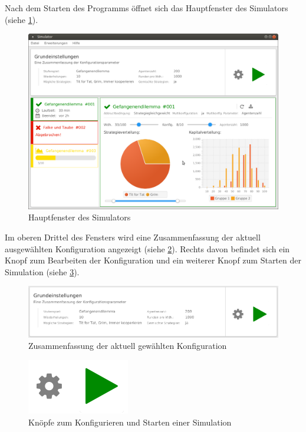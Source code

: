 \documentclass[parskip=full,11pt]{scrartcl}
\begin{document}
Nach dem Starten des Programms öffnet sich das Hauptfenster des Simulators \\(siehe \cref{fig:home}).

\begin{figure}[hb]
	\includegraphics[width=\textwidth]{images/home.png}
	\caption{\label{fig:home}
		Hauptfenster des Simulators}
\end{figure}

Im oberen Drittel des Fensters wird eine Zusammenfassung der aktuell ausgewählten Konfiguration angezeigt (siehe \cref{fig:home_top}). Rechts davon befindet sich ein Knopf zum Bearbeiten der Konfiguration und ein weiterer Knopf zum Starten der Simulation (siehe \cref{fig:main_btn}).
 
\begin{figure}[hb]
	\centering
	\includegraphics[width=\textwidth]{images/home_top.png}
	\caption{\label{fig:home_top}
	Zusammenfassung der aktuell gewählten Konfiguration}
\end{figure} 
 
\begin{figure}[ht]
	\centering
 	\includegraphics{images/main_btn.png}
 	\caption{\label{fig:main_btn}
 		Knöpfe zum Konfigurieren und Starten einer Simulation}
\end{figure}
\end{document}
